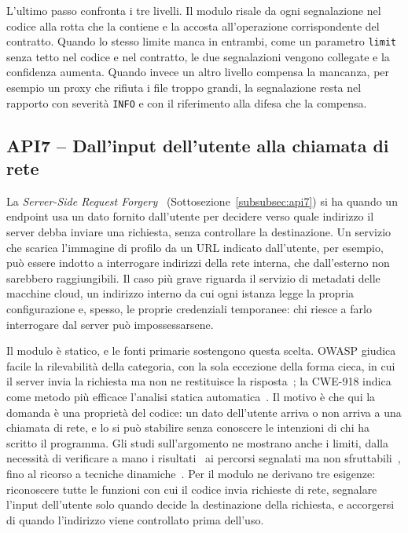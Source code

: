 L'ultimo passo confronta i tre livelli. Il modulo risale da ogni segnalazione
nel codice alla rotta che la contiene e la accosta all'operazione
corrispondente del contratto. Quando lo stesso limite manca in entrambi, come
un parametro \texttt{limit} senza tetto nel codice e nel contratto, le due
segnalazioni vengono collegate e la confidenza aumenta. Quando invece un altro
livello compensa la mancanza, per esempio un proxy che rifiuta i file troppo
grandi, la segnalazione resta nel rapporto con severità \texttt{INFO} e con il
riferimento alla difesa che la compensa.

\subsection{API7 -- Dall'input dell'utente alla chiamata di rete}
\label{sec:rilevamento-ssrf}
\label{sec:metodo-ricerca-rilevazione}

La \emph{Server-Side Request Forgery}~\cite{owasp2023api7}
(Sottosezione~\ref{subsubsec:api7}) si ha quando un endpoint usa un dato
fornito dall'utente per decidere verso quale indirizzo il server debba inviare
una richiesta, senza controllare la destinazione. Un servizio che scarica
l'immagine di profilo da un URL indicato dall'utente, per esempio, può essere
indotto a interrogare indirizzi della rete interna, che dall'esterno non
sarebbero raggiungibili. Il caso più grave riguarda il servizio di metadati
delle macchine cloud, un indirizzo interno da cui ogni istanza legge la propria
configurazione e, spesso, le proprie credenziali temporanee: chi riesce a farlo
interrogare dal server può impossessarsene.

Il modulo è statico, e le fonti primarie sostengono questa scelta. OWASP giudica
facile la rilevabilità della categoria, con la sola eccezione della forma
cieca, in cui il server invia la richiesta ma non ne restituisce la
risposta~\cite{owasp2023api7}; la CWE-918 indica come metodo più efficace
l'analisi statica automatica~\cite{cwe918}. Il motivo è che qui la domanda è
una proprietà del codice: un dato dell'utente arriva o non arriva a una
chiamata di rete, e lo si può stabilire senza conoscere le intenzioni di chi ha
scritto il programma. Gli studi sull'argomento ne mostrano anche i limiti,
dalla necessità di verificare a mano i risultati~\cite{wessels2024ssrf} ai
percorsi segnalati ma non sfruttabili~\cite{ji2025artemis}, fino al ricorso a
tecniche dinamiche~\cite{wang2024ssrfuzz}. Per il modulo ne derivano tre
esigenze: riconoscere tutte le funzioni con cui il codice invia richieste di
rete, segnalare l'input dell'utente solo quando decide la destinazione della
richiesta, e accorgersi di quando l'indirizzo viene controllato prima
dell'uso.

